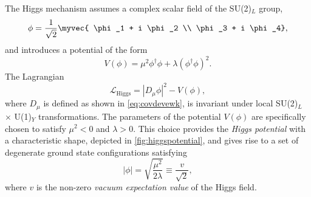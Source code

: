 
The Higgs mechanism assumes a complex scalar field of the SU(2)$_L$ group,
\begin{equation}
  \phi = \frac{1}{\sqrt{2}} \myvec { \phi_1 + i \phi_2 \\ \phi_3 + i \phi_4},
\end{equation}
and introduces a potential of the form
\begin{equation}
  V(\phi) = \mu^2\phi^\dagger\phi + \lambda \left(\phi^\dagger\phi \right)^2.
  \label{eq:higgspotential}
\end{equation}
The Lagrangian 
\begin{equation}
  \mathcal{L}_{\text{Higgs}} = |D_\mu\phi|^2 - V(\phi), %
  \label{eq:lagrangianhiggs}
\end{equation}
where $D_\mu$ is defined as shown in \cref{eq:covdevewk}, is invariant under local SU(2)$_L$ $\times$ U(1)$_Y$ transformations.
The parameters of the potential $V(\phi)$ are specifically chosen to satisfy $\mu^2 < 0$ and $\lambda > 0$.
This choice provides the \emph{Higgs potential} with a characteristic shape, depicted in \cref{fig:higgspotential}, and gives rise to a set of degenerate ground state configurations satisfying
\begin{equation}
  |\phi| = \sqrt{ \frac{\mu^2}{2\lambda} } \equiv \frac{ v }{\sqrt{2}},
  \label{eq:higgsminima}
\end{equation}
where $v$ is the non-zero \emph{vacuum expectation value} of the Higgs field.
